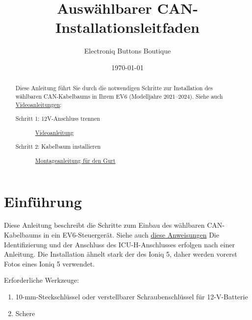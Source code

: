 \documentclass[superscriptaddress,onecolumn,floatfix]{revtex4-2}
\makeatletter
\DeclareRobustCommand{\selectlanguage}[1]{%
    \@ifundefined{alias@\string#1}
      {\ORIGselectlanguage{#1}}
      {\begingroup\edef\x{\endgroup
         \noexpand\ORIGselectlanguage{\@nameuse{alias@#1}}}\x}%
}
\makeatother
\begin{document}
\selectlanguage{de}

\begin{abstract}
  Diese Anleitung führt Sie durch die notwendigen Schritte zur Installation des wählbaren CAN-Kabelbaums in Ihrem EV6 (Modelljahre 2021–2024). Siehe auch \href{https://youtube.com/playlist?list=PLYCTmVJH4UYqnw87UZAaqMo1GrOv0cJaL}{Videoanleitungen}:
  \begin{description}
    \item[Schritt 1: 12V-Anschluss trennen] \href{https://youtu.be/ePBdyeBYKk4}{Videoanleitung}
    \item[Schritt 2: Kabelbaum installieren] \href{https://youtu.be/kVvkR4ZLFMI}{Montageanleitung für den Gurt}
  \end{description}
\end{abstract}
\title{Auswählbarer CAN-Installationsleitfaden}
\author{Electroniq Buttons Boutique}
\date{\today}

\maketitle


\section{Einführung}
Diese Anleitung beschreibt die Schritte zum Einbau des wählbaren CAN-Kabelbaums in ein EV6-Steuergerät. Siehe auch \href{https://github.com/dragz/explorationsincarhacking/blob/main/articles/getting_past_the_secure_gateway/getting_past_the_secure_gateway.md}{diese Anweisungen} Die Identifizierung und der Anschluss des ICU-H-Anschlusses erfolgen nach einer Anleitung. Die Installation ähnelt stark der des Ioniq 5, daher werden vorerst Fotos eines Ioniq 5 verwendet.

Erforderliche Werkzeuge:
\begin{enumerate}
  \item 10-mm-Steckschlüssel oder verstellbarer Schraubenschlüssel für 12-V-Batterie
  \item Schere
\end{enumerate}
\end{document}
